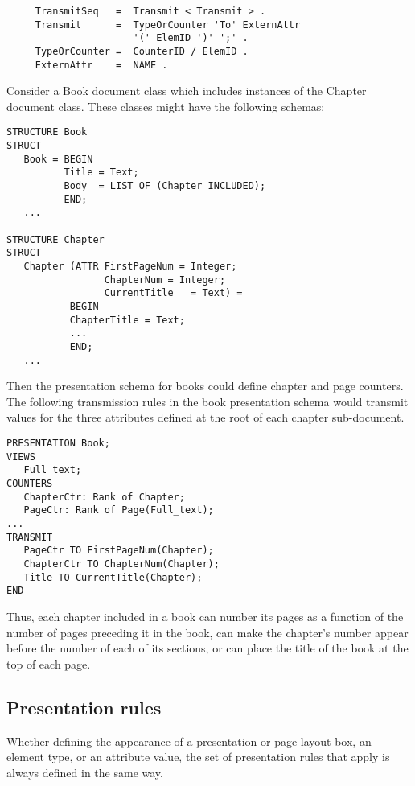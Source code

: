 \begin{verbatim}
     TransmitSeq   =  Transmit < Transmit > .
     Transmit      =  TypeOrCounter 'To' ExternAttr
                      '(' ElemID ')' ';' .
     TypeOrCounter =  CounterID / ElemID .
     ExternAttr    =  NAME .
\end{verbatim}

\begin{example}
Consider a Book document class which includes instances of the Chapter
document class.  These classes might have the following schemas:

\begin{verbatim}
STRUCTURE Book
STRUCT
   Book = BEGIN
          Title = Text;
          Body  = LIST OF (Chapter INCLUDED);
          END;
   ...

STRUCTURE Chapter
STRUCT
   Chapter (ATTR FirstPageNum = Integer;
                 ChapterNum = Integer;
                 CurrentTitle   = Text) =
           BEGIN
           ChapterTitle = Text;
           ...
           END;
   ...
\end{verbatim}

Then the presentation schema for books could define chapter and page
counters.  The following transmission rules in the book presentation
schema would transmit values for the three attributes defined at the
root of each chapter sub-document.

\begin{verbatim}
PRESENTATION Book;
VIEWS
   Full_text;
COUNTERS
   ChapterCtr: Rank of Chapter;
   PageCtr: Rank of Page(Full_text);
...
TRANSMIT
   PageCtr TO FirstPageNum(Chapter);
   ChapterCtr TO ChapterNum(Chapter);
   Title TO CurrentTitle(Chapter);
END
\end{verbatim}

Thus, each chapter included in a book can number its pages as a
function of the number of pages preceding it in the book, can make
the chapter's number appear before the number of each of its sections,
or can place the title of the book at the top of each page.
\end{example}

\subsection{Presentation rules}

Whether defining the appearance of a presentation or page layout box,
an element type, or an attribute value, the set of presentation rules
that apply is always defined in the same way.

